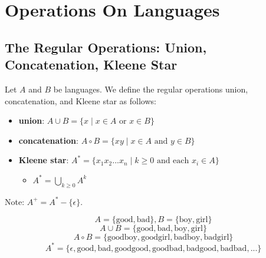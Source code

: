 \documentclass[11pt,a4paper]{article}
\begin{document}
\tableofcontents


\section{Operations On Languages}
\subsection{The Regular Operations: Union, Concatenation, Kleene Star}
\begin{definition}
    Let $A$ and $B$ be languages. We define the regular operations union, concatenation, and Kleene star as follows:

    \begin{itemize}
        \item \textbf{union}: $A\cup B = \{x \mid x\in A\text{ or }x\in B\}$
        \item \textbf{concatenation}: $A\circ B = \{xy\mid x\in A\text{ and }y\in B\}$
        \item \textbf{Kleene star}: $A^* = \{x_1x_2 ... x_n\mid k\geq 0 \text{ and each } x_i\in A\}$
        \begin{itemize}
            \item $A^* = \bigcup\limits_{k\geq 0}A^k$
        \end{itemize}
    \end{itemize}

    Note: $A^+=A^*-\{\epsilon\}$.
\end{definition}

\begin{example}
    $$A=\{\text{good},\text{bad}\},B=\{\text{boy},\text{girl}\}$$
    $$A\cup B=\{\text{good},\text{bad},\text{boy},\text{girl}\}$$
    $$A\circ B=\{\text{goodboy},\text{goodgirl},\text{badboy},\text{badgirl}\}$$
    $$A^*=\{\epsilon,\text{good},\text{bad},\text{goodgood},\text{goodbad},\text{badgood},\text{badbad},...\}$$
\end{example}
\end{document}
